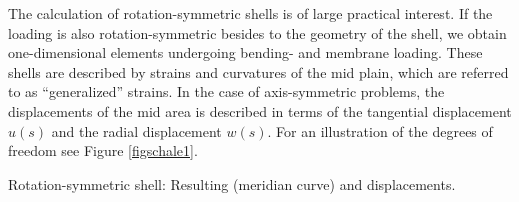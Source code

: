 
The calculation of rotation-symmetric shells is of large 
practical interest. 
If the loading is also rotation-symmetric besides to the 
geometry of the shell, we obtain one-dimensional elements 
undergoing bending- and membrane loading. 
These shells are described by strains and curvatures of the 
mid plain, which are referred to as ``generalized'' 
strains. 
In the case of axis-symmetric problems, the displacements 
of the mid area is described in terms of the tangential 
displacement $u(s)$ and the radial displacement $w(s)$. 
For an illustration of the degrees of freedom see 
Figure \ref{figschale1}. %

\begin{Figure}[htb]
\begin{center}

\setlength{\baselineskip}{11pt}
\caption{Rotation-symmetric shell: Resulting (meridian curve) and displacements.}
\label{figschale1}
\end{center}
\end{Figure}%

